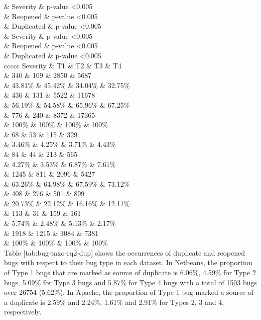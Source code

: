 \& Severity \& p-value \textless{}0.005\\
\& Reopened \& p-value \textless{}0.005\\
\& Duplicated \& p-value \textless{}0.005\\
\& Severity \& p-value \textless{}0.005\\
\& Reopened \& p-value \textless{}0.005\\
\& Duplicated \& p-value \textless{}0.005\\
{c\textbar{}c\textbar{}c\textbar{}c\textbar{}c} Severity \& T1 \& T2 \&
T3 \& T4\\[2\baselineskip]\& 340 \& 109 \& 2850 \& 5687\\
\& 43.81\% \& 45.42\% \& 34.04\% \& 32.75\%\\
\& 436 \& 131 \& 5522 \& 11678\\
\& 56.19\% \& 54.58\% \& 65.96\% \& 67.25\%\\
\& 776 \& 240 \& 8372 \& 17365\\
\& 100\% \& 100\% \& 100\% \& 100\%\\[2\baselineskip]\& 68 \& 53 \& 115
\& 329\\
\& 3.46\% \& 4.25\% \& 3.71\% \& 4.43\%\\
\& 84 \& 44 \& 213 \& 565\\
\& 4.27\% \& 3.53\% \& 6.87\% \& 7.61\%\\
\& 1245 \& 811 \& 2096 \& 5427\\
\& 63.26\% \& 64.98\% \& 67.59\% \& 73.12\%\\
\& 408 \& 276 \& 501 \& 899\\
\& 20.73\% \& 22.12\% \& 16.16\% \& 12.11\%\\
\& 113 \& 31 \& 159 \& 161\\
\& 5.74\% \& 2.48\% \& 5.13\% \& 2.17\%\\
\& 1918 \& 1215 \& 3084 \& 7381\\
\& 100\% \& 100\% \& 100\% \& 100\%\\
Table {[}tab:bug-taxo-rq2-dup{]} shows the occurrences of duplicate and
reopened bugs with respect to their bug type in each dataset. In
Netbeans, the proportion of Type 1 bugs that are marked as source of
duplicate is 6.06\%, 4.59\% for Type 2 bugs, 5.09\% for Type 3 bugs and
5.87\% for Type 4 bugs with a total of 1503 bugs over 26754 (5.62\%). In
Apache, the proportion of Type 1 bug marked a source of a duplicate is
2.59\% and 2.24\%, 1.61\% and 2.91\% for Types 2, 3 and 4, respectively.

